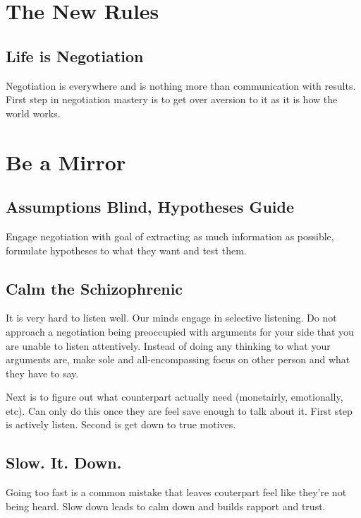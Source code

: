 \documentclass{summary}
\begin{document}
\maketitle %
\tableofcontents %
\thispagestyle{empty} %

\section{The New Rules}
\subsection{Life is Negotiation}
Negotiation is everywhere and is nothing more than communication with results. First step in negotiation mastery is to get over aversion to it as it is how the world works.

\section{Be a Mirror}

\subsection{Assumptions Blind, Hypotheses Guide}
Engage negotiation with goal of extracting as much information as possible, formulate hypotheses to what they want and test them.

\subsection{Calm the Schizophrenic}
It is very hard to listen well. Our minds engage in selective listening. Do not approach a negotiation being preoccupied with arguments for your side that you are unable to listen attentively. Instead of doing any thinking to what your arguments are, make sole and all-encompassing focus on other person and what they have to say.

Next is to figure out what counterpart actually need (monetairly, emotionally, etc). Can only do this once they are feel save enough to talk about it. First step is actively listen. Second is get down to true motives.

\subsection{Slow. It. Down.}
Going too fast is a common mistake that leaves couterpart feel like they're not being heard. Slow down leads to calm down and builds rapport and trust.
\end{document}
